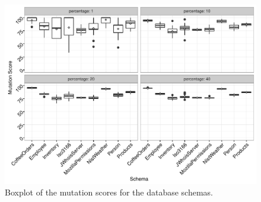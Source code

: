 \begin{figure}[t]

  \vspace{-14.5em}

  \includegraphics[scale = 0.5]{graphs/schema_vs_ms.pdf}

  \caption{\label{fig:graph}Boxplot of the mutation scores for the database schemas.}

  \vspace{-.5em}

\end{figure}
